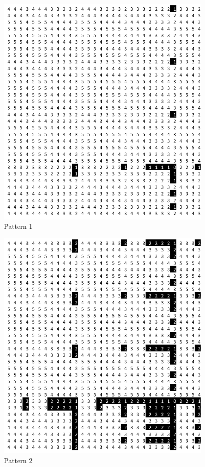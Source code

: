 \documentclass[oneside,12pt]{DISCSthesis}
\begin{document}
\begin{figure}[h]
			\begin{minipage}{.135\textwidth}\centering\includegraphics[width=0.95\textwidth]{img/1}\\ Pattern 1 \end{minipage}
			\begin{minipage}{.135\textwidth}\centering\includegraphics[width=0.95\textwidth]{img/2}\\ Pattern 2 \end{minipage}

\end{figure}
\end{document}
